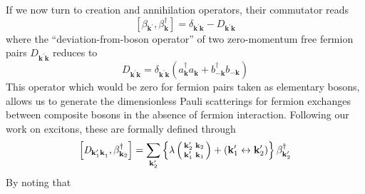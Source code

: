 \documentclass[epj]{svjour}
\newcommand{\vk}{\ensuremath{\mathbf{k}}}
\begin{document}
If we now turn to creation and annihilation operators, their commutator reads
\begin{equation}  \label{eq:betacom}
\left[\beta_{\mathbf{k} ^{\prime}},\beta^{\dagger}_{\mathbf{k} }\right] 
=\delta_{\mathbf{k} ^{\prime}\mathbf{k} }-\mathit{D} _{\mathbf{k} ^{\prime}%
\mathbf{k} }
\end{equation}
where the ``deviation-from-boson operator'' of two zero-momentum free fermion pairs $\mathit{D} _{\mathbf{k} ^{\prime}\mathbf{k%
} }$ reduces to 
\begin{equation}  \label{eq:D}
\mathit{D} _{\mathbf{k} ^{\prime}\mathbf{k} }=\delta_{\mathbf{k} ^{\prime}%
\mathbf{k} }\left(a^{\dagger}_{\mathbf{k}}a^{}_{\mathbf{k}
}+b^{\dagger}_{-\mathbf{k} }b^{}_{-\mathbf{k}
}\right) 
\end{equation}
This operator which would be  zero for fermion pairs  taken as
elementary bosons, allows us to generate the dimensionless Pauli scatterings for fermion
exchanges between composite bosons in the absence of fermion interaction. Following our work on excitons\cite%
{CobosonPhysicsReports}, these are formally defined through 
\begin{equation}\label{eq:dbeta}
\left[\mathit{D} _{\mathbf{k} ^{\prime}_1\mathbf{k} ^{}_1},\beta^{\dagger}_{%
\mathbf{k} _2}\right]  =\sum_{\mathbf{k} ^{\prime}_2}\left\{\lambda\left(%
\begin{smallmatrix}\vk'_2&\vk_2\\\vk'_1&\vk_1\end{smallmatrix}\right) 
+\left(\mathbf{k} ^{\prime}_1\leftrightarrow\mathbf{k} ^{\prime}_2\right)
\right\} \beta^{\dagger}_{\mathbf{k} ^{\prime}_2}
\end{equation}
By noting that
\end{document}
